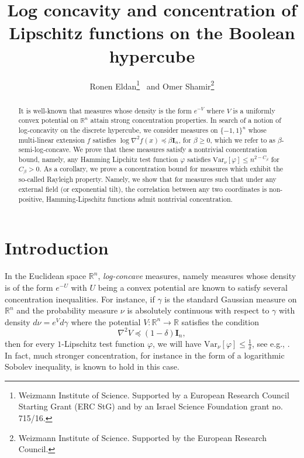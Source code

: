 \documentclass[12pt]{article}
\author{Ronen Eldan\thanks{Weizmann Institute of Science. Supported by a European Research Council Starting Grant (ERC StG) and by an Israel Science Foundation grant no. 715/16.} ~and Omer Shamir\thanks{Weizmann Institute of Science. Supported by the European Research Council.}}
\title{Log concavity and concentration of Lipschitz functions on the Boolean hypercube}
\def \RR {\mathbb R}
\def \Var {\mathrm{Var}}
\def \Id {\mathbf{I}_n}
\theoremstyle{definition}
\theoremstyle{remark}
\begin{document}
\maketitle

\begin{abstract}
It is well-known that measures whose density is the form $e^{-V}$ where $V$ is a uniformly convex potential on $\RR^n$ attain strong concentration properties. In search of a notion of log-concavity on the discrete hypercube, we consider measures on $\{-1,1\}^n$ whose multi-linear extension $f$ satisfies $\log \nabla^2 f(x) \preceq \beta \Id$, for $\beta \geq 0$, which we refer to as $\beta$-semi-log-concave. We prove that these measures satisfy a nontrivial concentration bound, namely, any Hamming Lipchitz test function $\varphi$ satisfies $\Var_\nu[\varphi] \leq n^{2-C_\beta}$ for $C_\beta>0$. As a corollary, we prove a concentration bound for measures which exhibit the so-called Rayleigh property. Namely, we show that for measures such that under any external field (or exponential tilt), the correlation between any two coordinates is non-positive, Hamming-Lipschitz functions admit nontrivial concentration.
\end{abstract}

\section{Introduction}
In the Euclidean space $\RR^n$, \emph{log-concave} measures, namely measures whose density is of the form $e^{-U}$ with $U$ being a convex potential are known to satisfy several concentration inequalities. For instance, if $\gamma$ is the standard Gaussian measure on $\RR^n$ and the probability measure $\nu$ is absolutely continuous with respect to $\gamma$ with density $d \nu = e^{V} d \gamma$ where the potential $V:\RR^n \to \RR$ satisfies the condition
\begin{equation}\label{eq:Rnsemilogconcave}
\nabla^2 V \preceq (1-\delta) \Id,
\end{equation}
then for every $1$-Lipschitz test function $\varphi$, we will have $\Var_\nu[\varphi] \leq \frac{1}{\delta}$, see e.g., \cite{Saumard14}. In fact, much stronger concentration, for instance in the form of a logarithmic Sobolev inequality, is known to hold in this case.
\end{document}
